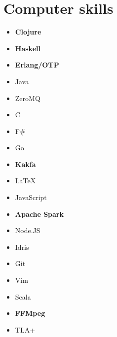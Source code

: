 \documentclass[11pt,a4paper,roman,english]{moderncv}        %
\begin{document}


\makecvtitle
\section{Computer skills}
\begin{multicols}{4}
	\begin{itemize}
		\item[] \textbf{Clojure}
		\item[] \textbf{Haskell}
		\item[] \textbf{Erlang/OTP}
		\item[] Java
		\item[] ZeroMQ
		\item[] C
		\item[] F\#
		\item[] Go
		\item[] \textbf{Kakfa}
		\item[] \LaTeX
		\item[] JavaScript
		\item[] \textbf{Apache Spark}
		\item[] Node.JS
	        \item[] Idris
		\item[] Git
		\item[] Vim
		\item[] Scala
		\item[] \textbf{FFMpeg}
        \item[] TLA+
	\end{itemize}
\end{multicols}
\end{document}
